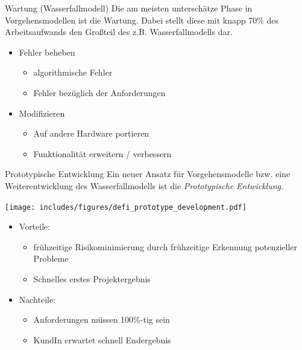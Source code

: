 \begin{bonus}{Wartung (Wasserfallmodell)}
    Die am meisten unterschätze Phase in Vorgehensmodellen ist die Wartung.
    Dabei stellt diese mit knapp 70\% des Arbeitsaufwands den Großteil des z.B. Wasserfallmodells dar.

    \begin{itemize}
        \item Fehler beheben
              \begin{itemize}
                  \item algorithmische Fehler
                  \item Fehler bezüglich der Anforderungen
              \end{itemize}
        \item Modifizieren
              \begin{itemize}
                  \item Auf andere Hardware portieren
                  \item Funktionalität erweitern / verbessern
              \end{itemize}
    \end{itemize}
\end{bonus}

\begin{defi}{Prototypische Entwicklung}
    Ein neuer Ansatz für Vorgehensmodelle bzw. eine Weiterentwicklung des Wasserfallmodells ist die \emph{Prototypische Entwicklung}.

    \begin{center}
        \texttt{[image: includes/figures/defi\_prototype\_development.pdf]}
    \end{center}

    \begin{itemize}
        \item Vorteile:
              \begin{itemize}
                  \item frühzeitige Risikominimierung durch frühzeitige Erkennung potenzieller Probleme
                  \item Schnelles erstes Projektergebnis
              \end{itemize}
        \item Nachteile:
              \begin{itemize}
                  \item Anforderungen müssen 100\%-tig sein
                  \item KundIn erwartet schnell Endergebnis
              \end{itemize}
    \end{itemize}
\end{defi}


